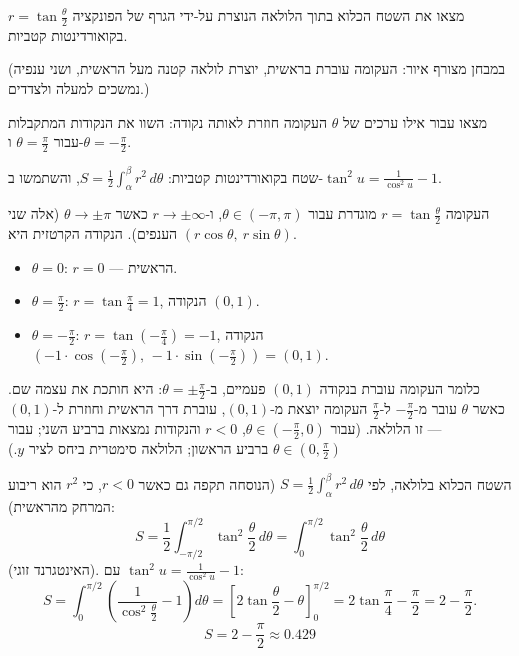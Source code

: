 
\begin{question}
מצאו את השטח הכלוא בתוך הלולאה הנוצרת על-ידי הגרף של הפונקציה $r=\tan\frac\theta2$ בקואורדינטות קטביות.

(במבחן מצורף איור: העקומה עוברת בראשית, יוצרת לולאה קטנה מעל הראשית, ושני ענפיה נמשכים למעלה ולצדדים.)
\end{question}

\begin{hint}
מצאו עבור אילו ערכים של $\theta$ העקומה חוזרת לאותה נקודה: השוו את הנקודות המתקבלות עבור $\theta=\frac\pi2$ ו-$\theta=-\frac\pi2$.
\end{hint}

\begin{hint}
שטח בקואורדינטות קטביות: $S=\frac12\int_\alpha^\beta r^2\,d\theta$, והשתמשו ב-$\tan^2u=\frac1{\cos^2u}-1$.
\end{hint}

\begin{solution}
העקומה $r=\tan\frac\theta2$ מוגדרת עבור $\theta\in(-\pi,\pi)$, ו-$r\to\pm\infty$ כאשר $\theta\to\pm\pi$ (אלה שני הענפים). הנקודה הקרטזית היא $(r\cos\theta,\ r\sin\theta)$.
\begin{itemize}
  \item $\theta=0$: $r=0$ — הראשית.
  \item $\theta=\frac\pi2$: $r=\tan\frac\pi4=1$, הנקודה $(0,1)$.
  \item $\theta=-\frac\pi2$: $r=\tan\left(-\frac\pi4\right)=-1$, הנקודה $(-1\cdot\cos(-\frac\pi2),\,-1\cdot\sin(-\frac\pi2))=(0,1)$.
\end{itemize}
כלומר העקומה עוברת בנקודה $(0,1)$ פעמיים, ב-$\theta=\pm\frac\pi2$: היא חותכת את עצמה שם. כאשר $\theta$ עובר מ-$-\frac\pi2$ ל-$\frac\pi2$ העקומה יוצאת מ-$(0,1)$, עוברת דרך הראשית וחוזרת ל-$(0,1)$ — זו הלולאה. (עבור $\theta\in(-\frac\pi2,0)$, $r<0$ והנקודות נמצאות ברביע השני; עבור $\theta\in(0,\frac\pi2)$ ברביע הראשון; הלולאה סימטרית ביחס לציר $y$.)

השטח הכלוא בלולאה, לפי $S=\frac12\int_\alpha^\beta r^2\,d\theta$ (הנוסחה תקפה גם כאשר $r<0$, כי $r^2$ הוא ריבוע המרחק מהראשית):
\[ S=\frac12\int_{-\pi/2}^{\pi/2}\tan^2\frac\theta2\,d\theta=\int_0^{\pi/2}\tan^2\frac\theta2\,d\theta \]
(האינטגרנד זוגי). עם $\tan^2u=\frac1{\cos^2u}-1$:
\[ S=\int_0^{\pi/2}\left(\frac{1}{\cos^2\frac\theta2}-1\right)d\theta=\left[2\tan\frac\theta2-\theta\right]_0^{\pi/2}=2\tan\frac\pi4-\frac\pi2=2-\frac\pi2. \]
\[ \boxed{S=2-\frac\pi2\approx0.429} \]
\end{solution}
